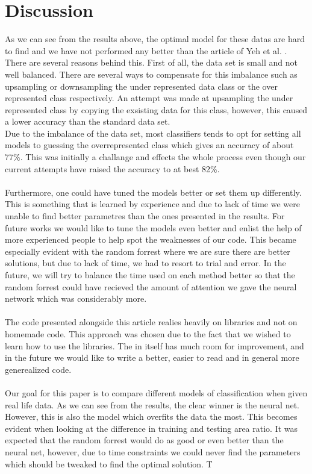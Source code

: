 \documentclass[12pt]{article}
\numberwithin{figure}{section}
\begin{document}
\section{Discussion}
As we can see from the results above, the optimal model for these datas are hard to find and we have not performed any better than the article of Yeh et al. \cite{yeh}. There are several reasons behind this. First of all, the data set is small and not well balanced. There are several ways to compensate for this imbalance such as upsampling or downsampling the under represented data class or the over represented class respectively. An attempt was made at upsampling the under represented class by copying the exsisting data for this class, however, this caused a lower accuracy than the standard data set. \\ 
Due to the imbalance of the data set, most classifiers tends to opt for setting all models to guessing the overrepresented class which gives an accuracy of about 77\%. This was initially a challange and effects the whole process even though our current attempts have raised the accuracy to at best 82\%.\\ \\
Furthermore, one could have tuned the models better or set them up differently. This is something that is learned by experience and due to lack of time we were unable to find better parametres than the ones presented in the results. For future works we would like to tune the models even better and enlist the help of more experienced people to help spot the weaknesses of our code. This became especially evident with the random forrest where we are sure there are better solutions, but due to lack of time, we had to resort to trial and error. In the future, we will try to balance the time used on each method better so that the random forrest could have recieved the amount of attention we gave the neural network which was considerably more. \\ \\
The code presented alongside this article realies heavily on libraries and not on homemade code. This approach was chosen due to the fact that we wished to learn how to use the libraries. The in itself has much room for improvement, and in the future we would like to write a better, easier to read and in general more generealized code. \\ \\
Our goal for this paper is to compare different models of classification when given real life data. As we can see from the results, the clear winner is the neural net. However, this is also the model which overfits the data the most. This becomes evident when looking at the difference in training and testing area ratio. It was expected that the random forrest would do as good or even better than the neural net, however, due to time constraints we could never find the parameters which should be tweaked to find the optimal solution. T
\end{document}
